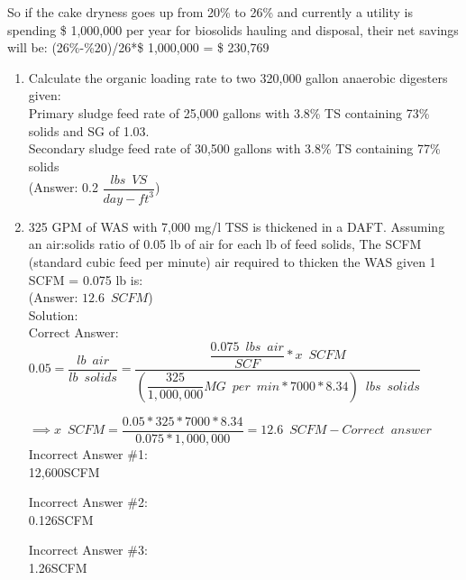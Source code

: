 \documentclass{article}
\begin{document}
\begin{enumerate}
So if the cake dryness goes up from 20\% to 26\% and currently a utility is spending \$ 1,000,000 per year for biosolids hauling and disposal, their net savings will be: (26\%-\%20)/26*\$ 1,000,000 = \$ 230,769
\end{enumerate}

\begin{enumerate}
\item Calculate the organic loading rate to two 320,000 gallon anaerobic digesters given:\\
Primary sludge feed rate of 25,000 gallons with 3.8\% TS containing 73\% solids and SG of 1.03.\\
Secondary sludge feed rate of 30,500 gallons with 3.8\% TS containing 77\% solids 
\\
(Answer: 0.2 $\dfrac{lbs \enspace VS}{day-ft^3}$)\\
\vspace{1cm}



\item 325 GPM of WAS with 7,000 mg/l TSS is thickened in a DAFT.  Assuming an air:solids ratio of 0.05 lb of air for each lb of feed solids, The SCFM (standard cubic feed per minute) air required to thicken the WAS given 1 SCFM = 0.075 lb is:\\
(Answer:  $12.6 \enspace SCFM$)\\
Solution:\\

Correct Answer:\\
$0.05=\dfrac{lb \enspace air}{lb \enspace solids}=\dfrac{\dfrac{0.075 \enspace lbs  \enspace air}{SCF}*x \enspace SCFM}{(\dfrac{325}{1,000,000}MG \enspace per \enspace min*7000*8.34) \enspace lbs  \enspace solids}$\\
\vspace{0.5cm}

$\implies x \enspace SCFM=\dfrac{0.05*325*7000*8.34}{0.075*1,000,000}=\boxed{12.6 \enspace SCFM} - Correct \enspace answer$\\
\vspace{0.5cm}
Incorrect Answer \#1:\\
12,600SCFM

\vspace{0.5cm}
Incorrect Answer \#2:\\
0.126SCFM


\vspace{0.5cm}
Incorrect Answer \#3:\\
1.26SCFM


\end{enumerate}
\end{document}
